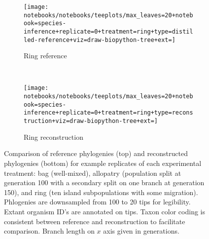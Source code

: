 \begin{figure}
  \begin{subfigure}{.45\linewidth}
    \centering
    \texttt{[image: notebooks/notebooks/teeplots/max\_leaves=20+notebook=species-inference+replicate=0+treatment=ring+type=distilled-reference+viz=draw-biopython-tree+ext=]}
    \caption{Ring reference}
    \label{fig:species-example-replicates:ring-reference}
  \end{subfigure}
  \,
  \begin{subfigure}{.45\linewidth}
    \centering
    \texttt{[image: notebooks/notebooks/teeplots/max\_leaves=20+notebook=species-inference+replicate=0+treatment=ring+type=reconstruction+viz=draw-biopython-tree+ext=]}
    \caption{Ring reconstruction}
    \label{fig:species-example-replicates:ring-reconstruction}
  \end{subfigure}
  \caption{Comparison of reference phylogenies (top) and reconstructed phylogenies (bottom) for example replicates of each experimental treatment: bag (well-mixed), allopatry (population split at generation 100 with a secondary split on one branch at generation 150), and ring (ten island subpopulations with some migration).
  Phlogenies are downsampled from 100 to 20 tips for legibility.
  Extant organism ID's are annotated on tips.
  Taxon color coding is consistent between reference and reconstruction to facilitate comparison.
  Branch length on $x$ axis given in generations.
  }
  \label{fig:species-example-replicates}

\end{figure}
%
%
%
%
%
%
